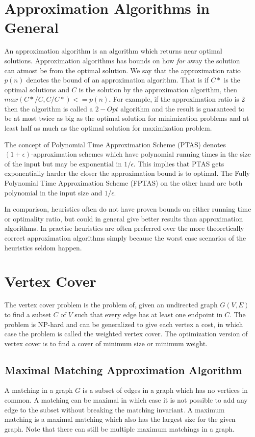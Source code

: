 \section{Approximation Algorithms in General}
An approximation algorithm is an algorithm which returns near optimal solutions. Approximation algorithms has bounds on how \textit{far} away the solution can atmost be from the optimal solution. We say that the approximation ratio $p(n)$ denotes the bound of an approximation algorithm. That is if $C*$ is the optimal solutions and $C$ is the solution by the approximation algorithm, then $max(C*/C,C/C*) <= p(n)$. For example, if the approximation ratio is 2 then the algorithm is called a $2-Opt$ algorithm and the result is guaranteed to be at most twice as big as the optimal solution for minimization problems and at least half as much as the optimal solution for maximization problem.

The concept of Polynomial Time Approximation Scheme (PTAS) denotes $(1+\epsilon)$-approximation schemes which have polynomial running times in the size of the input but may be exponential in $1/\epsilon$. This implies that PTAS gets exponentially harder the closer the approximation bound is to optimal. The Fully Polynomial Time Approximation Scheme (FPTAS) on the other hand are both polynomial in the input size and $1/\epsilon$. 

In comparison, heuristics often do not have proven bounds on either running time or optimality ratio, but could in general give better results than approximation algorithms. In practise heuristics are often preferred over the more theoretically correct approximation algorithms simply because the worst case scenarios of the heuristics seldom happen.

\section{Vertex Cover}
The vertex cover problem is the problem of, given an undirected graph $G(V,E)$ to find a subset $C$ of $V$ such that every edge has at least one endpoint in $C$. The problem is NP-hard and can be generalized to give each vertex a cost, in which case the problem is called the weighted vertex cover. The optimization version of vertex cover is to find a cover of minimum size or minimum weight.

\subsection{Maximal Matching Approximation Algorithm}
A matching in a graph $G$ is a subset of edges in a graph which has no vertices in common. A matching can be maximal in which case it is not possible to add any edge to the subset without breaking the matching invariant. A maximum matching is a maximal matching which also has the largest size for the given graph. Note that there can still be multiple maximum matchings in a graph. 

